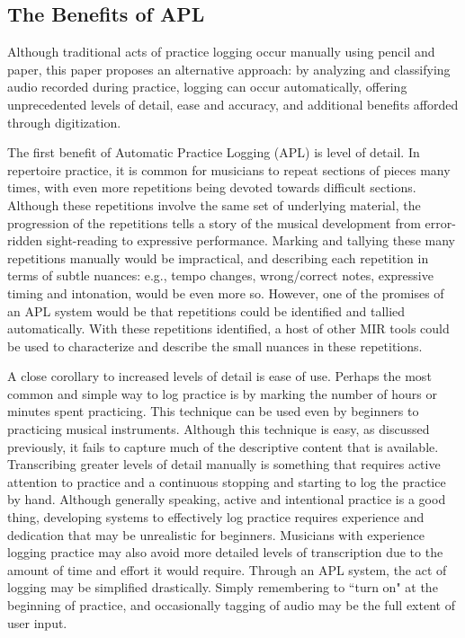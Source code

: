 \documentclass{article}
\begin{document}
\subsection{The Benefits of APL}
Although traditional acts of practice logging occur manually using pencil and paper, this paper proposes an alternative approach: by analyzing and classifying audio recorded during practice, logging can occur automatically, offering unprecedented levels of detail, ease and accuracy, and additional benefits afforded through digitization. 

The first benefit of Automatic Practice Logging (APL) is level of detail. 
In repertoire practice, it is common for musicians to repeat sections of pieces many times, with even more repetitions being devoted towards difficult sections. 
Although these repetitions involve the same set of underlying material, the progression of the repetitions tells a story of the musical development from error-ridden sight-reading to expressive performance.  
Marking and tallying these many repetitions manually would be impractical, and describing each repetition in terms of subtle nuances: e.g., tempo changes, wrong/correct notes, expressive timing and intonation, would be even more so. 
However, one of the promises of an APL system would be that repetitions could be identified and tallied automatically. 
With these repetitions identified, a host of other MIR tools could be used to characterize and describe the small nuances in these repetitions.

A close corollary to increased levels of detail is ease of use. 
Perhaps the most common and simple way to log practice is by marking the number of hours or minutes spent practicing. 
This technique can be used even by beginners to practicing musical instruments. 
Although this technique is easy, as discussed previously, it fails to capture much of the descriptive content that is available. 
Transcribing greater levels of detail manually is something that requires active attention to practice and a continuous stopping and starting to log the practice by hand.  
Although generally speaking, active and intentional practice is a good thing, developing systems to effectively log practice requires experience and dedication that may be unrealistic for beginners.
Musicians with experience logging practice may also avoid more detailed levels of transcription due to the amount of time and effort it would require. 
Through an APL system, the act of logging may be simplified drastically.
Simply remembering to ``turn on" at the beginning of practice, and occasionally tagging of audio may be the full extent of user input. 
\end{document}

